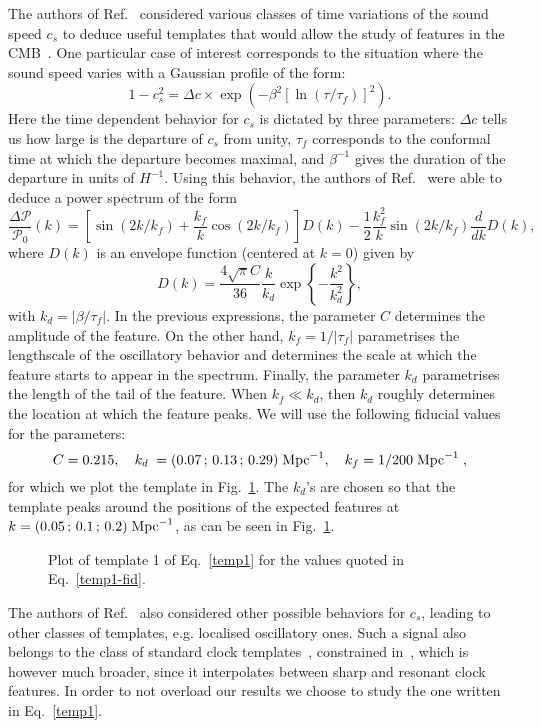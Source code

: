 \documentclass[12pt]{article}
\newcommand{\be}{\begin{equation}}
\newcommand{\ee}{\end{equation}}
\begin{document}
The authors of Ref.~\cite{Achucarro:2014msa} considered various classes of time variations of the sound speed $c_s$ to deduce useful templates that would allow the study of features in the CMB~\cite{Torrado:2016sls}. One particular case of interest corresponds to the situation where the sound speed varies with a Gaussian profile of the form:
\be
1 - c_s^2  = \Delta c \times \exp (- \beta^2 \left[\ln (\tau / \tau_f) \right]^2 ) .
\ee
Here the time dependent behavior for $c_s$ is dictated by three parameters: $\Delta c$ tells us how large is the departure of $c_s$ from unity, $\tau_f$ corresponds to the conformal time at which the departure becomes maximal, and $\beta^{-1}$ gives the duration of the departure in units of $H^{-1}$. Using this behavior, the authors of Ref.~\cite{Achucarro:2014msa} were able to deduce a power spectrum of the form
\be \label{temp1}
\frac{\Delta \mathcal P}{\mathcal P_0 } (k) =  \left[ \sin(2 k / k_f) + \frac{k_f}{k} \cos(2 k / k_f) \right] D (k) - \frac{1}{2}  \frac{k_f^2}{k} \sin(2 k / k_f)  \frac{d}{d  k} D (k) ,
\ee
where $D (k)$ is an envelope function (centered at $k = 0$) given by
\be
D (k) = \frac{4\sqrt{\pi}C}{36} \frac{ k}{k_d} \exp \left\{ -  \frac{ k^2}{k_d^2} \right\} ,
\ee
with $k_d = |\beta / \tau_f|$. In the previous expressions, the parameter $C$ determines the amplitude of the feature. On the other hand, $k_f = 1 / |\tau_f|$ parametrises the lengthscale of the oscillatory behavior and determines the scale at which the feature starts to appear in the spectrum. Finally, the parameter $k_d$ parametrises the length of the tail of the feature. When $k_f \ll k_d$, then $k_d$ roughly determines the location at which the feature peaks. We will use the following fiducial values~\cite{Achucarro:2014msa} for the parameters:
%
\be \label{temp1-fid}
C= 0.215, \quad k_d \;= (0.07\,;\,0.13\,;\, 0.29) \; {\rm Mpc}^{-1}, \quad k_f = 1/200 \; {\rm Mpc}^{-1} \; ,
\ee
for which we plot the template in Fig.~\ref{fig:temp1}. The $k_d$'s are chosen so that the template peaks around the positions of the expected features at $k=(0.05\,;\,0.1\,;\, 0.2) \; {\rm Mpc}^{-1}$, as can be seen in Fig.~\ref{fig:temp1}.
%
\begin{figure}[h]
\centering
{}
\caption{Plot of template 1 of Eq.~\eqref{temp1} for the values quoted in Eq.~\eqref{temp1-fid}.}
\label{fig:temp1}
\end{figure}
%

The authors of Ref.~\cite{Achucarro:2014msa} also considered other possible behaviors for $c_s$, leading to other classes of templates, e.g. localised oscillatory ones. Such a signal also belongs to the class of standard clock templates~\cite{Chen:2014joa,Chen:2014cwa}, constrained in~\cite{Chen:2016vvw}, which is however much broader, since it interpolates between sharp and resonant clock features. In order to not overload our results we choose to study the one written in Eq.~\eqref{temp1}.
\end{document}
